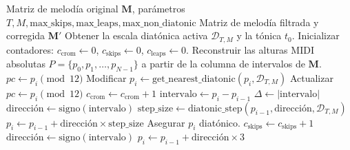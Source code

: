 \begin{algorithm}[H]
\caption{Algoritmo del Árbol de Decisión para Corrección de Melodías}
\begin{algorithmic}[1]
\REQUIRE Matriz de melodía original $\mathbf{M}$, parámetros $T, M, \text{max\_skips}, \text{max\_leaps}, \text{max\_non\_diatonic}$
\ENSURE Matriz de melodía filtrada y corregida $\mathbf{M}'$
\STATE Obtener la escala diatónica activa $\mathcal{D}_{T,M}$ y la tónica $t_0$.
\STATE Inicializar contadores: $c_{\text{crom}} \leftarrow 0$, $c_{\text{skips}} \leftarrow 0$, $c_{\text{leaps}} \leftarrow 0$.
\STATE Reconstruir las alturas MIDI absolutas $P = \{p_0, p_1, \dots, p_{N-1}\}$ a partir de la columna de intervalos de $\mathbf{M}$.
    \STATE $pc \leftarrow p_i \pmod{12}$
            \STATE Modificar $p_i \leftarrow \text{get\_nearest\_diatonic}(p_i, \mathcal{D}_{T,M})$
            \STATE Actualizar $pc \leftarrow p_i \pmod{12}$
        \ELSE
            \STATE $c_{\text{crom}} \leftarrow c_{\text{crom}} + 1$
        \ENDIF
    \ENDIF
        \STATE $\text{intervalo} \leftarrow p_i - p_{i-1}$
        \STATE $\Delta \leftarrow |\text{intervalo}|$
                \STATE $\text{dirección} \leftarrow \text{signo}(\text{intervalo})$
                \STATE $\text{step\_size} \leftarrow \text{diatonic\_step}(p_{i-1}, \text{dirección}, \mathcal{D}_{T,M})$
                \STATE $p_i \leftarrow p_{i-1} + \text{dirección} \times \text{step\_size}$
                \STATE Asegurar $p_i$ diatónico.
            \ELSE
                \STATE $c_{\text{skips}} \leftarrow c_{\text{skips}} + 1$
            \ENDIF
                \STATE $\text{dirección} \leftarrow \text{signo}(\text{intervalo})$
                    \STATE $p_i \leftarrow p_{i-1} + \text{dirección} \times 3$

\end{algorithmic}
\end{algorithm}
